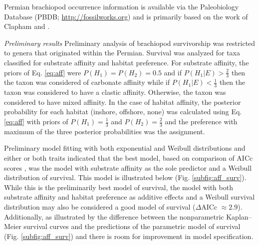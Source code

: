 \documentclass[12pt,letterpaper]{article}
\begin{document}
Permian brachiopod occurrence information is available via the Paleobiology Database (PBDB; \url{http://fossilworks.org}) and is primarily based on the work of Clapham \citep{Clapham2006,Clapham2008a,Clapham2007a,Clapham2012,Clapham2007} and \citet{Waterhouse1987}.


\textit{Preliminary results}
Preliminary analysis of brachiopod survivorship was restricted to genera that originated within the Permian. Survival was analyzed for taxa classified for substrate affinity and habitat preference. For substrate affinity, the priors of Eq. \ref{eq:aff} were \(P(H_{1}) = P(H_{2}) = 0.5\) and if \(P(H_{1}|E) > \frac{2}{3}\) then the taxon was considered of carbonate affinity while if \(P(H_{1}|E) < \frac{1}{3}\) then the taxon was considered to have a clastic affinity. Otherwise, the taxon was considered to have mixed affinity. In the case of habitat affinity, the posterior probability for each habitat (inshore, offshore, none) was calculated using Eq. \ref{eq:aff} with priors of \(P(H_{1}) = \frac{1}{3}\) and \(P(H_{2}) = \frac{2}{3}\) and the preference with maximum of the three posterior probabilities was the assignment.

Preliminary model fitting with both exponential and Weibull distributions and either or both traits indicated that the best model, based on comparison of AICc scores \citep{Hurvich1989,Akaike1974,Burnham2002a}, was the model with substrate affinity as the sole predictor and a Weibull distribution of survival. This model is illustrated below (Fig. \ref{subfig:aff_surv}). While this is the preliminarily best model of survival, the model with both substrate affinity and habitat preference as additive effects and a Weibull survival distribution may also be considered a good model of survival (\(\Delta\)AICc \(\approx 2.9\)). Additionally, as illustrated by the difference between the nonparametric Kaplan--Meier survival curves and the predictions of the parametric model of survival (Fig. \ref{subfig:aff_surv}) and there is room for improvement in model specification.
\end{document}
